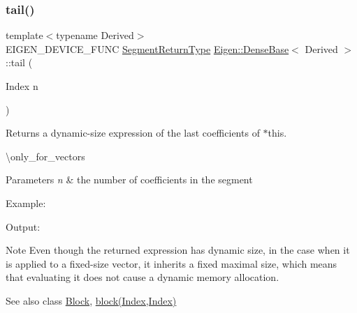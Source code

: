 \subsubsection{\texorpdfstring{tail()}{tail()}\hspace{0.1cm}{\footnotesize\ttfamily [1/2]}}
{\footnotesize\ttfamily template$<$typename Derived$>$ \\
E\+I\+G\+E\+N\+\_\+\+D\+E\+V\+I\+C\+E\+\_\+\+F\+U\+NC \mbox{\hyperlink{class_eigen_1_1_vector_block}{Segment\+Return\+Type}} \mbox{\hyperlink{class_eigen_1_1_dense_base}{Eigen\+::\+Dense\+Base}}$<$ Derived $>$\+::tail (\begin{DoxyParamCaption}\item[{Index}]{n }\end{DoxyParamCaption})\hspace{0.3cm}{\ttfamily [inline]}}

\begin{DoxyReturn}{Returns}
a dynamic-\/size expression of the last coefficients of $\ast$this.
\end{DoxyReturn}
\textbackslash{}only\+\_\+for\+\_\+vectors


\begin{DoxyParams}{Parameters}
{\em n} & the number of coefficients in the segment\\
\hline
\end{DoxyParams}
Example\+: 
\begin{DoxyCodeInclude}{0}
\end{DoxyCodeInclude}
 Output\+: 
\begin{DoxyVerbInclude}
\end{DoxyVerbInclude}


\begin{DoxyNote}{Note}
Even though the returned expression has dynamic size, in the case when it is applied to a fixed-\/size vector, it inherits a fixed maximal size, which means that evaluating it does not cause a dynamic memory allocation.
\end{DoxyNote}
\begin{DoxySeeAlso}{See also}
class \mbox{\hyperlink{class_eigen_1_1_block}{Block}}, \mbox{\hyperlink{class_eigen_1_1_dense_base_adfadb0b888358ae1f521cc0a106ddb85}{block(\+Index,\+Index)}} 
\end{DoxySeeAlso}
\mbox{\label{class_eigen_1_1_dense_base_ae3094ce815b8a2a0c9dd5054a8eee9f8}} 
